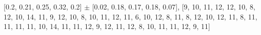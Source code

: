 
[0.2, 0.21, 0.25, 0.32, 0.2] $\pm$ [0.02, 0.18, 0.17, 0.18, 0.07], [9, 10, 11, 12, 12, 10, 8, 12, 10, 14, 11, 9, 12, 10, 8, 10, 11, 12, 11, 6, 10, 12, 8, 11, 8, 12, 10, 12, 11, 8, 11, 11, 11, 11, 10, 14, 11, 11, 12, 9, 12, 11, 12, 8, 10, 11, 11, 12, 9, 11]\\
    